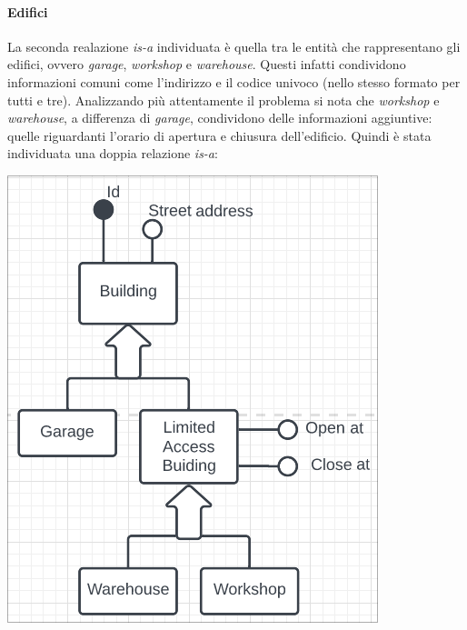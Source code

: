 \documentclass[12pt]{report}
\begin{document}
\paragraph{Edifici}
La seconda realazione \textit{is-a} individuata è quella tra le entità che rappresentano 
gli edifici, ovvero \textit{garage}, \textit{workshop} e \textit{warehouse}. Questi infatti
condividono informazioni comuni come l'indirizzo e il codice univoco (nello stesso formato 
per tutti e tre). Analizzando più attentamente il problema si nota che \textit{workshop} e 
\textit{warehouse}, a differenza di \textit{garage}, condividono delle informazioni aggiuntive:
quelle riguardanti l'orario di apertura e chiusura dell'edificio. Quindi è stata individuata
una doppia relazione \textit{is-a}:
\begin{center}
\includegraphics[scale=0.50]{isa2.png}
\end{center}
\end{document}
